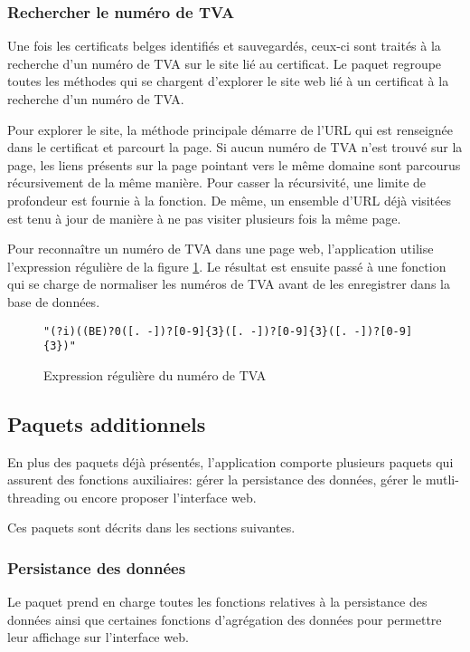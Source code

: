 \documentclass{article}
\begin{document}
\subsubsection{Rechercher le numéro de TVA}

Une fois les certificats belges identifiés et sauvegardés, ceux-ci sont traités à la recherche d'un numéro de TVA sur le site lié au certificat.  Le paquet  regroupe toutes les méthodes qui se chargent d'explorer le site web lié à un certificat à la recherche d'un numéro de TVA.

Pour explorer le site, la méthode principale démarre de l'URL qui est renseignée dans le certificat et parcourt la page.  Si aucun numéro de TVA n'est trouvé sur la page, les liens présents sur la page pointant vers le même domaine sont parcourus récursivement de la même manière.  Pour casser la récursivité, une limite de profondeur est fournie à la fonction.  De même, un ensemble d'URL déjà visitées est tenu à jour de manière à ne pas visiter plusieurs fois la même page.

Pour reconnaître un numéro de TVA dans une page web, l'application utilise l'expression régulière de la figure \ref{tva-fig}.  Le résultat est ensuite passé à une fonction qui se charge de normaliser les numéros de TVA avant de les enregistrer dans la base de données.

\begin{figure}
\centering
\texttt{"(?i)((BE)?0([. -])?[0-9]\{3\}([. -])?[0-9]\{3\}([. -])?[0-9]\{3\})"}
\caption{Expression régulière du numéro de TVA}
\label{tva-fig}
\end{figure}


\subsection{Paquets additionnels}

En plus des paquets déjà présentés, l'application comporte plusieurs paquets qui assurent des fonctions auxiliaires: gérer la persistance des données, gérer le mutli-threading ou encore proposer l'interface web.

Ces paquets sont décrits dans les sections suivantes.

\subsubsection{Persistance des données}

Le paquet  prend en charge toutes les fonctions relatives à la persistance des données ainsi que certaines fonctions d'agrégation des données pour permettre leur affichage sur l'interface web.
\end{document}
